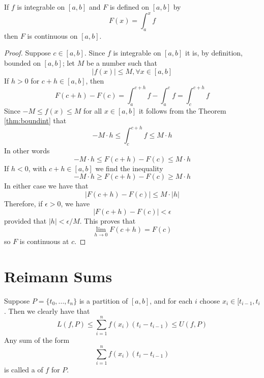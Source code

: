 \documentclass[12pt, a4paper, oneside, openright, titlepage]{book}
\begin{document}
\begin{thm}
    If $f$ is integrable on $[a,b]$ and $F$ is defined on $[a,b]$ by \begin{equation*}
        F(x) = \int_a^xf
    \end{equation*}
    then $F$ is continuous on $[a,b]$.
\end{thm}
\begin{proof}
    Suppose $c \in [a,b]$. Since $f$ is integrable on $[a,b]$ it is, by definition, bounded on $[a,b]$; let $M$ be a number such that \begin{equation*}
        |f(x)| \leq M,\forall x \in [a,b]
    \end{equation*}
    If $h > 0$ for $c+h \in [a,b]$, then \begin{equation*}
        F(c+h) - F(c) = \int_a^{c+h}f - \int_a^cf = \int_c^{c+h}f
    \end{equation*}
    Since $-M \leq f(x) \leq M$ for all $x \in [a,b]$ it follows from the Theorem \ref{thm:boundint} that \begin{equation*}
        -M\cdot h \leq \int_c^{c+h}f \leq M\cdot h
    \end{equation*}
    In other words \begin{equation*}
        -M\cdot h \leq F(c+h) - F(c) \leq M\cdot h
    \end{equation*}
    If $h < 0$, with $c+h \in [a,b]$ we find the inequality \begin{equation*}
        -M\cdot h \geq F(c+h) - F(c) \geq M\cdot h
    \end{equation*}
    In either case we have that \begin{equation*}
        |F(c+h) - F(c)| \leq M\cdot |h|
    \end{equation*}
    Therefore, if $\epsilon > 0$, we have \begin{equation*}
        |F(c+h) - F(c)| < \epsilon
    \end{equation*}
    provided that $|h| < \epsilon/M$. This proves that \begin{equation*}
        \lim\limits_{h\rightarrow 0}F(c+h) = F(c)
    \end{equation*}
    so $F$ is continuous at $c$.
\end{proof}

\section{Reimann Sums}

\begin{defn}
    Suppose $P = \{t_0,...,t_n\}$ is a partition of $[a,b]$, and for each $i$ choose $x_i \in [t_{i-1},t_i$. Then we clearly have that \begin{equation}
        L(f,P) \leq \sum\limits_{i=1}^nf(x_i)(t_i-t_{i-1}) \leq U(f,P)
    \end{equation}
    Any sum of the form \begin{equation}
        \sum\limits_{i=1}^nf(x_i)(t_i-t_{i-1})
    \end{equation}
    is called a  of $f$ for $P$.
\end{defn}
\end{document}
